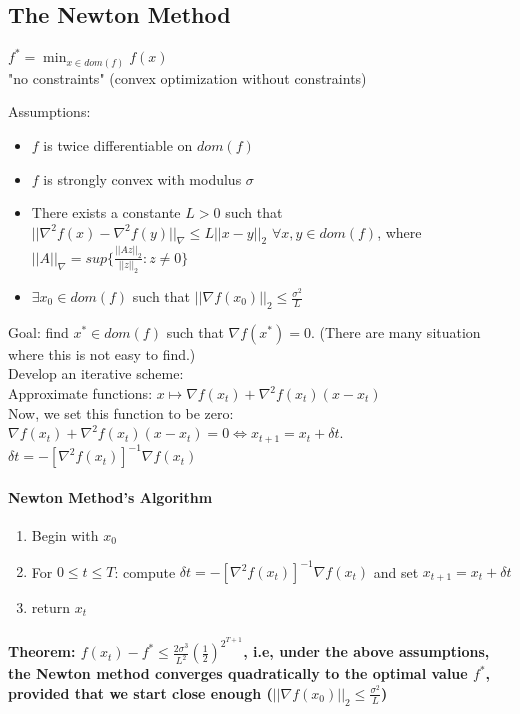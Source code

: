 \documentclass[main]{subfiles}
\begin{document}
\subsection{The Newton Method}

$f^* = \displaystyle \min_{x \in dom(f)} f(x)$\\
"no constraints" (convex optimization without constraints)

Assumptions:
\begin{itemize}
\item $f$ is twice differentiable on $dom(f)$
\item $f$ is strongly convex with modulus $\sigma$
\item There exists a constante $L > 0$ such that $||\nabla^2 f(x)
- \nabla^2f(y)||_\nabla \leq L ||x-y||_2$ $\forall x, y \in dom(f)$,
where $||A||_\nabla = sup\{\frac{||Az||_2}{||z||_2}: z \neq 0 \}$
\item $\exists x_0 \in dom(f)$ such that $||\nabla f(x_0)||_2 \leq
\frac{\sigma^2}{L}$
\end{itemize}

Goal: find $x^* \in dom(f)$ such that $\nabla f(x^*) = 0$.
(There are many situation where this is not easy to find.)\\
Develop an iterative scheme:\\

Approximate functions: $x \mapsto \nabla f(x_t) + \nabla^2 f(x_t)(x-x_t)$\\
Now, we set this function to be zero:\\
$\nabla f(x_t) + \nabla^2 f(x_t)(x-x_t) = 0 \iff x_{t+1} = x_t + \delta t$.\\
$\delta t = -[\nabla^2 f(x_t)]^{-1} \nabla f(x_t)$\\

\paragraph{Newton Method's Algorithm}

\begin{enumerate}
\item Begin with $x_0$
\item For $0 \leq t \leq T$:
\subitem compute $\delta t = -[\nabla^2 f(x_t)]^{-1} \nabla f(x_t)$ and set
$x_{t+1} = x_t + \delta t$
\item return $x_t$
\end{enumerate}


\paragraph{Theorem: $f(x_t) - f^* \leq \frac{2 \sigma^3}{L^2}
(\frac{1}{2})^{2^{T+1}}$, i.e, under the above assumptions, the Newton method
converges quadratically to the optimal value $f^*$, provided that we start
close enough ($||\nabla f(x_0)||_2 \leq \frac{\sigma^2}{L}$)}
\end{document}
